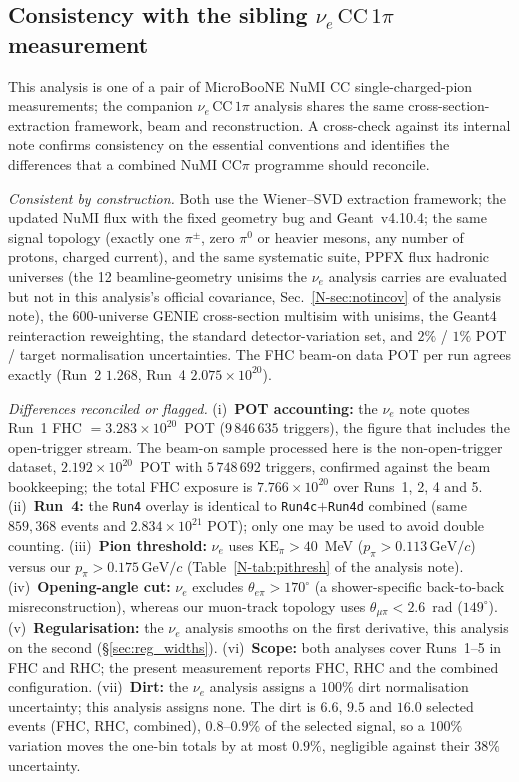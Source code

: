\documentclass[11pt,a4paper]{article}
\newcommand{\GeVc}{\,\text{GeV}\!/c}
\newcommand{\noteref}[2]{#1~\ref{N-#2} of the analysis note}
\begin{document}
\subsection{Consistency with the sibling $\nu_e\,\mathrm{CC}\,1\pi$ measurement}
\label{sec:nueconsistency}

This analysis is one of a pair of MicroBooNE NuMI CC single-charged-pion
measurements; the companion $\nu_e\,\mathrm{CC}\,1\pi$ analysis shares the same
cross-section-extraction framework, beam and reconstruction. A cross-check against
its internal note confirms consistency on the essential conventions and identifies
the differences that a combined NuMI CC$\pi$ programme should reconcile.

\emph{Consistent by construction.} Both use the Wiener--SVD extraction framework;
the updated NuMI flux with the fixed geometry bug and Geant~v4.10.4; the same
signal topology (exactly one $\pi^\pm$, zero $\pi^0$ or heavier mesons, any number
of protons, charged current), and the same systematic suite, PPFX flux
hadronic universes (the 12 beamline-geometry unisims the $\nu_e$ analysis carries are
evaluated but not in this analysis's official covariance, \noteref{Sec.}{sec:notincov}), the
600-universe GENIE cross-section multisim with unisims, the Geant4 reinteraction
reweighting, the standard detector-variation set, and $2\%$ / $1\%$ POT / target
normalisation uncertainties. The FHC beam-on data POT per run
agrees exactly (Run~2 $1.268$, Run~4 $2.075\times10^{20}$).

\emph{Differences reconciled or flagged.} (i)~\textbf{POT accounting:} the
$\nu_e$ note quotes Run~1 FHC $=3.283\times10^{20}$~POT ($9\,846\,635$ triggers), the
figure that includes the open-trigger stream. The beam-on sample processed here is the
non-open-trigger dataset, $2.192\times10^{20}$~POT with $5\,748\,692$ triggers, confirmed
against the beam bookkeeping; the total FHC exposure is $7.766\times10^{20}$ over Runs~1, 2, 4
and 5. (ii)~\textbf{Run~4:} the \texttt{Run4} overlay
is identical to \texttt{Run4c}$+$\texttt{Run4d} combined (same $859{,}368$ events
and $2.834\times10^{21}$ POT); only one may be used to avoid double counting.
(iii)~\textbf{Pion threshold:} $\nu_e$ uses $\mathrm{KE}_\pi>40$~MeV
($p_\pi>0.113\GeVc$) versus our $p_\pi>0.175\GeVc$
(\noteref{Table}{tab:pithresh}). (iv)~\textbf{Opening-angle cut:} $\nu_e$ excludes
$\theta_{e\pi}>170^\circ$ (a shower-specific back-to-back misreconstruction),
whereas our muon-track topology uses $\theta_{\mu\pi}<2.6$~rad ($149^\circ$).
(v)~\textbf{Regularisation:} the $\nu_e$ analysis smooths on the first derivative,
this analysis on the second (\S\ref{sec:reg_widths}). (vi)~\textbf{Scope:}
both analyses cover Runs~1--5 in FHC and RHC; the present measurement reports FHC,
RHC and the combined configuration. (vii)~\textbf{Dirt:} the $\nu_e$ analysis assigns a $100\%$ dirt
normalisation uncertainty; this analysis assigns none. The dirt is $6.6$, $9.5$ and $16.0$ selected events
(FHC, RHC, combined), $0.8$--$0.9\%$ of the selected signal, so a $100\%$ variation moves the one-bin totals
by at most $0.9\%$, negligible against their $38\%$ uncertainty.
\end{document}

